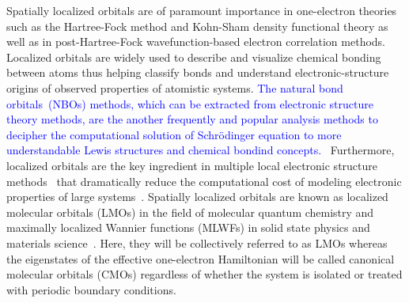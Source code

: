\documentclass[aps,prl,reprint,amsmath,amssymb]{revtex4-1}
\begin{document}
Spatially localized orbitals are of paramount importance in one-electron theories such as the Hartree-Fock method and Kohn-Sham density functional theory as well as in post-Hartree-Fock wavefunction-based electron correlation methods.
Localized orbitals are widely used to describe and visualize chemical bonding between atoms thus helping classify bonds and understand electronic-structure origins of observed properties of atomistic systems.
\textcolor{blue}{The natural bond orbitals~(NBOs) methods, which can be extracted from electronic structure theory methods,  are the another frequently and popular analysis methods to decipher the computational solution of Schr\"{o}dinger equation to more understandable Lewis structures and chemical bondind concepts.~\cite{glendening2012natural, weinhold2012natural}}
Furthermore, localized orbitals are the key ingredient in multiple local electronic structure methods~\cite{goedecker1994efficient, bowler2012methods, zalesny2011linear, pulay1986orbital, saebo2001low, pisani2005local, hampel1996local, forner1997numerical} that dramatically reduce the computational cost of modeling electronic properties of large systems~\cite{saebo1993local, schutz1999low, hetzer2000low, schutz2001low}.
Spatially localized orbitals are known as localized molecular orbitals (LMOs) in the field of molecular quantum chemistry and maximally localized Wannier functions (MLWFs) in solid state physics and materials science~\cite{marzari2012maximally}. 
Here, they will be collectively referred to as LMOs whereas the eigenstates of the effective one-electron Hamiltonian will be called canonical molecular orbitals (CMOs) regardless of whether the system is isolated or treated with periodic boundary conditions.
\end{document}
